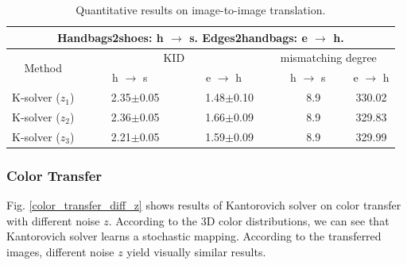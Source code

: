 \documentclass[runningheads]{llncs}
\begin{document}
\begin{table}[!h]
	\centering
	\vspace{-20pt}
	\caption{Quantitative results on image-to-image translation.}
	\vspace{3pt}
	\begin{tabular}{c|c|c|c|c}
		\multicolumn{5}{c}{Handbags2shoes: h $\rightarrow$ s.  Edges2handbags: e $\rightarrow$ h.} \\
		\hline
		\multirow{2}{*}{Method} & \multicolumn{2}{c|}{~~~~~~~~~~~~~~KID~~~~~~~~~~~~~~} & \multicolumn{2}{c}{~mismatching degree~~} \\ \cline{2-5} 
		& ~~~h $\rightarrow$ s~~~ & e $\rightarrow$ h & ~~~h $\rightarrow$ s~~~    & e $\rightarrow$ h                 \\ \hline %
		K-solver ($z_1$)               & ~~2.35$\pm$0.05   & ~~1.48$\pm$0.10  & ~~8.9               & 330.02             \\ \hline
		K-solver ($z_2$)               & ~~2.36$\pm$0.05   & ~~1.66$\pm$0.09  & ~~8.9               & 329.83             \\ \hline
		K-solver ($z_3$)              & ~~2.21$\pm$0.05   & ~~1.59$\pm$0.09  & ~~8.9               & 329.99             \\ \hline
	\end{tabular}
	\label{image_translation_table_appendix}
	\vspace{-15pt}
\end{table}

\subsubsection{Color Transfer}

Fig. \ref{color_transfer_diff_z} shows results of Kantorovich solver on color transfer with different noise $z$. 
According to the 3D color distributions, we can see that Kantorovich solver learns a stochastic mapping. According to the transferred images, different noise $z$ yield visually similar results.
\end{document}
